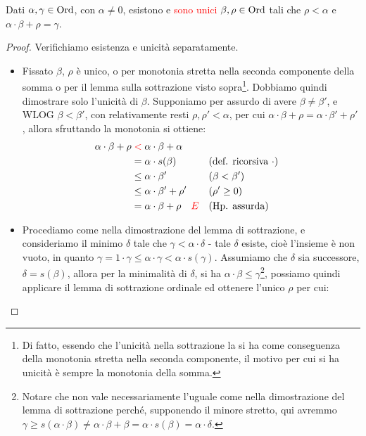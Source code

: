 \pagebreak

\begin{lemma}
	Dati $\alpha,\gamma \in \operatorname{Ord}$, con $\alpha \ne 0$, esistono e \textcolor{red}{sono unici} $\beta, \rho \in \operatorname{Ord}$ tali che $\rho < \alpha$ e $\alpha \cdot \beta + \rho = \gamma$.
\end{lemma}

\begin{proof}
	Verifichiamo esistenza e unicit\`a separatamente.
	\begin{itemize}
		\item[$\boxed{\text{unicit\`a}}$] Fissato $\beta$, $\rho$ \`e unico, o per monotonia stretta nella seconda componente della somma o per il lemma sulla sottrazione visto sopra\footnote{Di fatto, essendo che l'unicit\`a nella sottrazione la si ha come conseguenza della monotonia stretta nella seconda componente, il motivo per cui si ha unicit\`a \`e sempre la monotonia della somma.}.
		Dobbiamo quindi dimostrare solo l'unicit\`a di $\beta$. Supponiamo per assurdo di avere $\beta \ne \beta'$, e WLOG $\beta < \beta'$, con relativamente resti $\rho,\rho' < \alpha$, per cui $\alpha \cdot \beta + \rho = \alpha \cdot \beta' + \rho'$, allora sfruttando la monotonia si ottiene:
		\begin{align*}
			\alpha \cdot \beta +\rho  & \;\textcolor{red}{<}\; \alpha \cdot \beta + \alpha \\
									  & = \alpha \cdot s(\beta) &&\text{(def. ricorsiva $\cdot$)} \\
									  & \leq \alpha \cdot \beta' &&(\beta < \beta')\\
									  & \leq \alpha \cdot \beta' + \rho' &&(\rho' \geq 0)\\
									  & = \alpha \cdot \beta + \rho \quad \textcolor{red}{\lightning} &&(\text{Hp. assurda})
		\end{align*}
		\item[$\boxed{\text{esistenza}}$] Procediamo come nella dimostrazione del lemma di sottrazione, e consideriamo il minimo $\delta$ tale che $\gamma < \alpha \cdot \delta$ - tale $\delta$ esiste, cio\`e l'insieme \`e non vuoto, in quanto $\gamma = 1 \cdot \gamma \leq \alpha \cdot \gamma < \alpha \cdot s(\gamma)$.
		Assumiamo che $\delta$ sia successore, $\delta = s(\beta)$, allora per la minimalit\`a di $\delta$, si ha $\alpha \cdot \beta \leq \gamma$\footnote{Notare che non vale necessariamente l'uguale come nella dimostrazione del lemma di sottrazione perch\'e, supponendo il minore stretto, qui avremmo
		$\gamma \geq s(\alpha \cdot \beta) \ne \alpha \cdot \beta + \beta =  \alpha \cdot s(\beta) =\alpha \cdot \delta$.}, possiamo quindi applicare il lemma di sottrazione ordinale ed ottenere l'unico $\rho$ per cui:

\end{itemize}
\end{proof}
